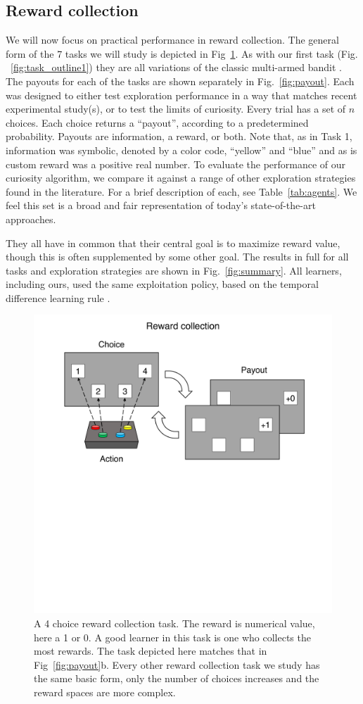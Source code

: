 \subsection{Reward collection} We will now focus on practical performance in reward collection. The general form of the 7 tasks we will study is depicted in Fig~\ref{fig:task_outline2}. As with our first task (Fig. ~\ref{fig:task_outline1}) they are all variations of the classic multi-armed bandit \citep{Sutton2018}. The payouts for each of the tasks are shown separately in Fig.~\ref{fig:payout}. Each was designed to either test exploration performance in a way that matches recent experimental study(s), or to test the limits of curiosity. Every trial has a set of $n$ choices. Each choice returns a “payout”, according to a predetermined probability. Payouts are information, a reward, or both. Note that, as in Task 1, information was symbolic, denoted by a color code, “yellow” and “blue” and as is custom reward was a positive real number. 
To evaluate the performance of our curiosity algorithm, we compare it against a range of other exploration strategies found in the literature. For a brief description of each, see Table~\ref{tab:agents}. We feel this set is a broad and fair representation of today's state-of-the-art approaches.

They all have in common that their central goal is to maximize reward value, though this is often supplemented by some other goal.  The results in full for all tasks and exploration strategies are shown in Fig.~\ref{fig:summary}. All learners, including ours, used the same exploitation policy, based on the temporal difference learning rule \citep{Sutton2018}.

\begin{figure}
	\begin{fullwidth}
	\includegraphics[width=.55\linewidth]{img/task_outline2.pdf} 
	\caption{A 4 choice reward collection task. The reward is numerical value, here a 1 or 0. A good learner in this task is one who collects the most rewards. The task depicted here matches that in Fig~\ref{fig:payout}b. Every other reward collection task we study has the same basic form, only the number of choices increases and the reward spaces are more complex.}
	\label{fig:task_outline2} 
	\end{fullwidth}
\end{figure}

